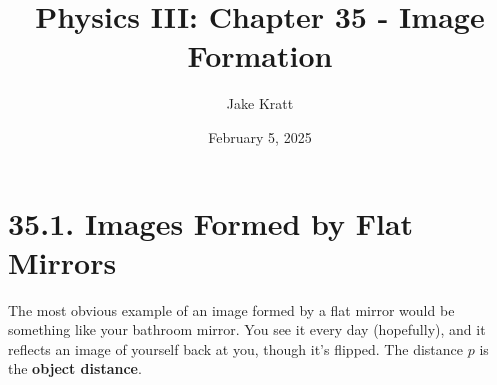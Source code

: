 \documentclass[12pt, letterpaper]{article}
\title{Physics III: Chapter 35 - Image Formation}
\author{Jake Kratt}
\date{February 5, 2025}
\begin{document}
\maketitle

\section*{35.1. Images Formed by Flat Mirrors}
The most obvious example of an image formed by a flat mirror would be something like your bathroom mirror. You see it every day (hopefully), and it reflects an image of yourself back at you, though it's flipped. The distance $p$ is the \textbf{object distance}.
\end{document}
